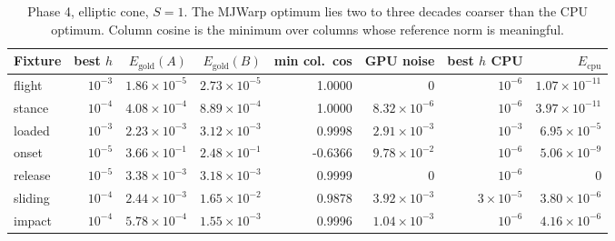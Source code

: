\documentclass[11pt,a4paper]{article}
\begin{document}
\begin{table}[htbp]
\centering
\footnotesize
\caption{Phase 4, elliptic cone, $S=1$. The MJWarp optimum lies two to three decades coarser than the CPU optimum. Column cosine is the minimum over columns whose reference norm is meaningful.}
\label{tab:besteps}
\begin{tabular}{lrrrrrrr}
\toprule
\textbf{Fixture} & \textbf{best }$h$ & $E_{\mathrm{gold}}(A)$ & $E_{\mathrm{gold}}(B)$ & \textbf{min col.\ cos} & \textbf{GPU noise} & \textbf{best }$h$\textbf{ CPU} & $E_{\mathrm{cpu}}$ \\
\midrule
flight & $10^{-3}$ & $1.86\times10^{-5}$ & $2.73\times10^{-5}$ & 1.0000 & $0$ & $10^{-6}$ & $1.07\times10^{-11}$ \\
stance & $10^{-4}$ & $4.08\times10^{-4}$ & $8.89\times10^{-4}$ & 1.0000 & $8.32\times10^{-6}$ & $10^{-6}$ & $3.97\times10^{-11}$ \\
loaded & $10^{-3}$ & $2.23\times10^{-3}$ & $3.12\times10^{-3}$ & 0.9998 & $2.91\times10^{-3}$ & $10^{-3}$ & $6.95\times10^{-5}$ \\
onset & $10^{-5}$ & $3.66\times10^{-1}$ & $2.48\times10^{-1}$ & -0.6366 & $9.78\times10^{-2}$ & $10^{-6}$ & $5.06\times10^{-9}$ \\
release & $10^{-5}$ & $3.38\times10^{-3}$ & $3.18\times10^{-3}$ & 0.9999 & $0$ & $10^{-6}$ & $0$ \\
sliding & $10^{-4}$ & $2.44\times10^{-3}$ & $1.65\times10^{-2}$ & 0.9878 & $3.92\times10^{-3}$ & $3\times10^{-5}$ & $3.80\times10^{-6}$ \\
impact & $10^{-4}$ & $5.78\times10^{-4}$ & $1.55\times10^{-3}$ & 0.9996 & $1.04\times10^{-3}$ & $10^{-6}$ & $4.16\times10^{-6}$ \\
\bottomrule
\end{tabular}
\end{table}
\end{document}
